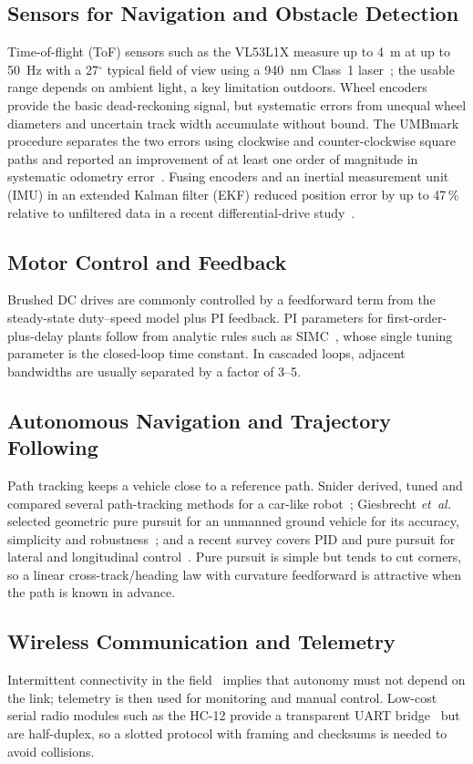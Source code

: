 \documentclass[conference]{IEEEtran}\newcommand{\haveieee}{}%
\begin{document}
\subsection{Sensors for Navigation and Obstacle Detection}
Time-of-flight (ToF) sensors such as the VL53L1X measure up to 4~m at up to 50~Hz with a 27$^\circ$ typical field of view using a 940~nm Class~1 laser~\cite{vl53l1x}; the usable range depends on ambient light, a key limitation outdoors. Wheel encoders provide the basic dead-reckoning signal, but systematic errors from unequal wheel diameters and uncertain track width accumulate without bound. The UMBmark procedure separates the two errors using clockwise and counter-clockwise square paths and reported an improvement of at least one order of magnitude in systematic odometry error~\cite{borenstein1996}. Fusing encoders and an inertial measurement unit (IMU) in an extended Kalman filter (EKF) reduced position error by up to 47\,\% relative to unfiltered data in a recent differential-drive study~\cite{amorim2025}.

\subsection{Motor Control and Feedback}
Brushed DC drives are commonly controlled by a feedforward term from the steady-state duty--speed model plus PI feedback. PI parameters for first-order-plus-delay plants follow from analytic rules such as SIMC~\cite{skogestad2003}, whose single tuning parameter is the closed-loop time constant. In cascaded loops, adjacent bandwidths are usually separated by a factor of 3--5.

\subsection{Autonomous Navigation and Trajectory Following}
Path tracking keeps a vehicle close to a reference path. Snider derived, tuned and compared several path-tracking methods for a car-like robot~\cite{snider2009}; Giesbrecht \emph{et~al.} selected geometric pure pursuit for an unmanned ground vehicle for its accuracy, simplicity and robustness~\cite{giesbrecht2005}; and a recent survey covers PID and pure pursuit for lateral and longitudinal control~\cite{jain2024}. Pure pursuit is simple but tends to cut corners, so a linear cross-track/heading law with curvature feedforward is attractive when the path is known in advance.

\subsection{Wireless Communication and Telemetry}
Intermittent connectivity in the field~\cite{boros2026} implies that autonomy must not depend on the link; telemetry is then used for monitoring and manual control. Low-cost serial radio modules such as the HC-12 provide a transparent UART bridge~\cite{hc12} but are half-duplex, so a slotted protocol with framing and checksums is needed to avoid collisions.
\end{document}
